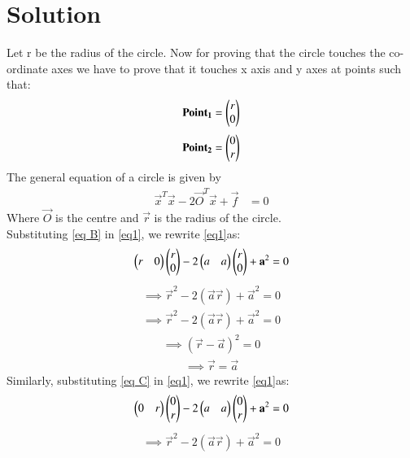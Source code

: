 \documentclass[journal,12pt,twocolumn]{IEEEtran}
\begin{document}
\section{ Solution}
Let r be the radius of the circle. Now for proving that the circle touches the co-ordinate axes we have to prove that it touches x axis and y axes at points such that:
\begin{align}
\mathbf{Point_{1}} = \begin{pmatrix} r \\ 0 \\\end{pmatrix}\label{eq B}
\end{align}
\begin{align}
\mathbf{Point_{2}} = \begin{pmatrix} 0 \\ r \\\end{pmatrix} \label{eq C}
\end{align}
The general equation of a circle is given by
\begin{align}
\vec{x}^T\vec{x} - 2\vec{O}^T\vec{x} + \vec{f}  &= 0 \label{eq 2}
\end{align}
Where $\vec{O}$ is the centre and $\vec{r}$ is the radius of the circle.\\
Substituting \eqref{eq B} in \eqref{eq1}, we rewrite \eqref{eq1}as:
\begin{align}
\begin{pmatrix}r&0\end{pmatrix}\begin{pmatrix}r\\0\end{pmatrix}-2\begin{pmatrix}a & a\end{pmatrix}\begin{pmatrix}r\\0\end{pmatrix}+\mathbf{a}^2 = 0 \label{eq3}
\end{align}
\begin {align}
\implies\vec{r}^2 -2\left(\vec{a}\vec{r}\right)+\vec{a}^2=0
\end{align}
\begin {align}
\implies\vec{r}^2 -2\left(\vec{a}\vec{r}\right)+\vec{a}^2=0
\end{align}
\begin {align}
\implies\left(\vec{r}- \vec{a}\right)^2=0
\end{align}
\begin{align}
\implies\vec{r}= \vec{a}
\end{align}
Similarly, substituting \eqref{eq C} in \eqref{eq1}, we rewrite \eqref{eq1}as:
\begin{align}
\begin{pmatrix}0&r\end{pmatrix}\begin{pmatrix}0\\r\end{pmatrix}-2\begin{pmatrix}a & a\end{pmatrix}\begin{pmatrix}0\\r\end{pmatrix}+\mathbf{a}^2 = 0 \label{eq3}
\end{align}
\begin {align}
\implies\vec{r}^2 -2\left(\vec{a}\vec{r}\right)+\vec{a}^2=0
\end{align}
\end{document}
